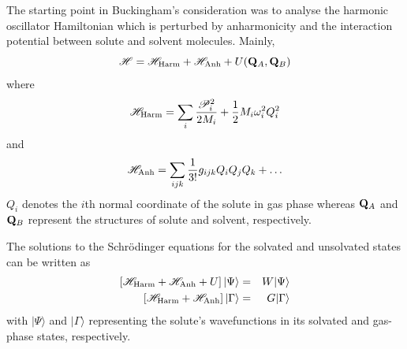 \documentclass[a4paper,titlepage,twoside,fleqn,12pt]{book}
\begin{document}
\begin{refsection}
The starting point in Buckingham's consideration was to analyse 
the harmonic oscillator Hamiltonian which is perturbed by anharmonicity
and the interaction potential between solute and solvent molecules. Mainly,
%
\begin{equation}
\mathscr{H} = \mathscr{H}_{\rm Harm} + \mathscr{H}_{\rm Anh} + U({\bf Q}_A,{\bf Q}_B)
\end{equation}
%
where
%
\begin{equation}\label{e:h_harm}
\mathscr{H}_{\rm Harm} = 
\sum_i \frac{\mathscr{P}_i^2}{2M_i} + \frac{1}{2} M_i \omega_i^2 Q_i^2
\end{equation}
%
and
%
\begin{equation}\label{e:h_anh}
\mathscr{H}_{\rm Anh} = 
\sum_{ijk} \frac{1}{3!} g_{ijk} Q_iQ_jQ_k + \ldots 
\end{equation}
%
$Q_i$ denotes the $i$th normal coordinate of the solute in gas phase whereas
${\bf Q}_A$ and ${\bf Q}_B$ represent the structures of solute and solvent, 
respectively.

The solutions to the Schr{\"o}dinger equations for the solvated and 
unsolvated states can be written as
%
\begin{eqnarray}
\left[ \mathscr{H}_{\rm Harm} + \mathscr{H}_{\rm Anh} + U \right] 
\vert \Psi \rangle &=& W \vert \Psi \rangle \\
\left[ \mathscr{H}_{\rm Harm} + \mathscr{H}_{\rm Anh} \right] 
\vert \Gamma \rangle &=& G \vert \Gamma \rangle 
\end{eqnarray}
%
with $\vert\Psi\rangle$ and $\vert\Gamma\rangle$ representing the solute's wavefunctions
in its solvated and gas\hyp{}phase states, respectively.


\end{refsection}
\end{document}
